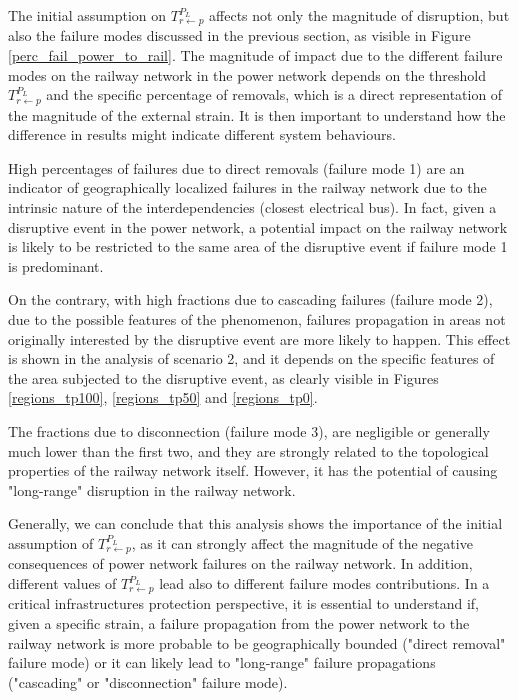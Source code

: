 \documentclass[review]{elsarticle}
\begin{document}
	
	The initial assumption on $T_{r \leftarrow p}^{P_L}$ affects not only the magnitude of disruption, but also the failure modes discussed in the previous section, as visible in Figure \ref{perc_fail_power_to_rail}. The magnitude of impact due to the different failure modes on the railway network in the power network depends on the threshold $T_{r \leftarrow p}^{P_L}$ and the specific percentage of removals, which is a direct representation of the magnitude of the external strain. It is then important to understand how the difference in results might indicate different system behaviours.
	
	High percentages of failures due to direct removals (failure mode 1) are an indicator of geographically localized failures in the railway network due to the intrinsic nature of the interdependencies (closest electrical bus). In fact, given a disruptive event in the power network, a potential impact on the railway network is likely to be restricted to the same area of the disruptive event if failure mode 1 is predominant.
	
	On the contrary, with high fractions due to cascading failures (failure mode 2), due to the possible  features of the phenomenon, failures propagation in areas not originally interested by the disruptive event are more likely to happen. This effect is shown in the analysis of scenario 2, and it depends on the specific features of the area subjected to the disruptive event, as clearly visible in Figures \ref{regions_tp100}, \ref{regions_tp50} and \ref{regions_tp0}. 
	
	The fractions due to disconnection (failure mode 3), are negligible or generally much lower than the first two, and they are strongly related to the topological properties of the railway network itself. However, it has the potential of causing "long-range" disruption in the railway network.
	
	Generally, we can conclude that this analysis shows the importance of the initial assumption of $T_{r \leftarrow p}^{P_L}$, as it can strongly affect the magnitude of the negative consequences of power network failures on the railway network. In addition, different values of $T_{r \leftarrow p}^{P_L}$ lead also to different failure modes contributions. In a critical infrastructures protection perspective, it is essential to understand if, given a specific strain, a failure propagation from the power network to the railway network is more probable to be geographically bounded ("direct removal" failure mode) or it can likely lead to "long-range" failure propagations ("cascading" or "disconnection" failure mode).
	
\end{document}
